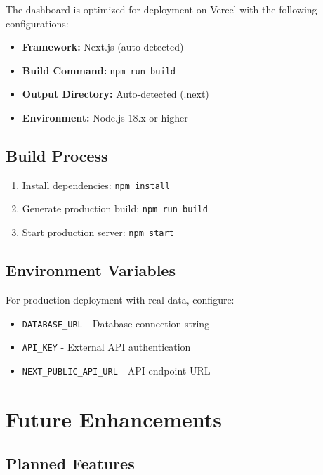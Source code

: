 \documentclass[12pt,a4paper]{article}
\begin{document}
The dashboard is optimized for deployment on Vercel with the following configurations:

\begin{itemize}
    \item \textbf{Framework:} Next.js (auto-detected)
    \item \textbf{Build Command:} \texttt{npm run build}
    \item \textbf{Output Directory:} Auto-detected (.next)
    \item \textbf{Environment:} Node.js 18.x or higher
\end{itemize}

\subsection{Build Process}

\begin{enumerate}
    \item Install dependencies: \texttt{npm install}
    \item Generate production build: \texttt{npm run build}
    \item Start production server: \texttt{npm start}
\end{enumerate}

\subsection{Environment Variables}

For production deployment with real data, configure:
\begin{itemize}
    \item \texttt{DATABASE\_URL} - Database connection string
    \item \texttt{API\_KEY} - External API authentication
    \item \texttt{NEXT\_PUBLIC\_API\_URL} - API endpoint URL
\end{itemize}

\section{Future Enhancements}

\subsection{Planned Features}
\end{document}
